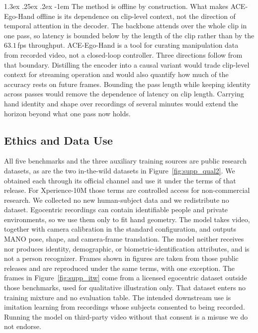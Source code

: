 \documentclass[10pt,twocolumn,letterpaper]{article}
\makeatletter
\renewcommand\paragraph{\@startsection{paragraph}{4}{\z@}%
  {1.3ex \@plus .25ex \@minus .2ex}%
  {-1em}%
  {\normalfont\normalsize\bfseries}}
\newcommand{\method}{ACE-Ego-Hand} %
\makeatother
\begin{document}
\paragraph{The method is offline by construction.} What makes \method{} offline is its dependence on clip-level context, not the direction of temporal attention in the decoder. The backbone attends over the whole clip in one pass, so latency is bounded below by the length of the clip rather than by the $63.1$\,fps throughput. \method{} is a tool for curating manipulation data from recorded video, not a closed-loop controller. Three directions follow from that boundary. Distilling the encoder into a causal variant would trade clip-level context for streaming operation and would also quantify how much of the accuracy rests on future frames. Bounding the pass length while keeping identity across passes would remove the dependence of latency on clip length. Carrying hand identity and shape over recordings of several minutes would extend the horizon beyond what one pass now holds.

\subsection{Ethics and Data Use}
All five benchmarks and the three auxiliary training sources are public research datasets, as are the two in-the-wild datasets in Figure~\ref{fig:supp_qual2}. We obtained each through its official channel and use it under the terms of that release. For Xperience-10M those terms are controlled access for non-commercial research. We collected no new human-subject data and we redistribute no dataset. Egocentric recordings can contain identifiable people and private environments, so we use them only to fit hand geometry. The model takes video, together with camera calibration in the standard configuration, and outputs MANO pose, shape, and camera-frame translation. The model neither receives nor produces identity, demographic, or biometric-identification attributes, and is not a person recognizer. Frames shown in figures are taken from those public releases and are reproduced under the same terms, with one exception. The frames in Figure~\ref{fig:supp_itw} come from a licensed egocentric dataset outside those benchmarks, used for qualitative illustration only. That dataset enters no training mixture and no evaluation table. The intended downstream use is imitation learning from recordings whose subjects consented to being recorded. Running the model on third-party video without that consent is a misuse we do not endorse.
\end{document}
